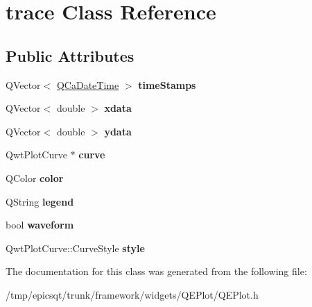 \hypertarget{classtrace}{
\section{trace Class Reference}
\label{classtrace}
}
\subsection*{Public Attributes}
\begin{DoxyCompactItemize}
\item 
\hypertarget{classtrace_a02a177cf962f807fb41bd277040e7225}{
QVector$<$ \hyperlink{classQCaDateTime}{QCaDateTime} $>$ {\bfseries timeStamps}}
\label{classtrace_a02a177cf962f807fb41bd277040e7225}

\item 
\hypertarget{classtrace_aee034ab4b7eb5ed62018399cc5280ee7}{
QVector$<$ double $>$ {\bfseries xdata}}
\label{classtrace_aee034ab4b7eb5ed62018399cc5280ee7}

\item 
\hypertarget{classtrace_a74a99e27ec3315fe20824ef643d7d0fa}{
QVector$<$ double $>$ {\bfseries ydata}}
\label{classtrace_a74a99e27ec3315fe20824ef643d7d0fa}

\item 
\hypertarget{classtrace_a450e899468c18d0f5a2be41285367143}{
QwtPlotCurve $\ast$ {\bfseries curve}}
\label{classtrace_a450e899468c18d0f5a2be41285367143}

\item 
\hypertarget{classtrace_a537d4c3ad1115226dfd52ed0895ff89c}{
QColor {\bfseries color}}
\label{classtrace_a537d4c3ad1115226dfd52ed0895ff89c}

\item 
\hypertarget{classtrace_abc26f3360f820f8dbe0e86a0f396909a}{
QString {\bfseries legend}}
\label{classtrace_abc26f3360f820f8dbe0e86a0f396909a}

\item 
\hypertarget{classtrace_a26de13a7b28c3548fdb9b59677498466}{
bool {\bfseries waveform}}
\label{classtrace_a26de13a7b28c3548fdb9b59677498466}

\item 
\hypertarget{classtrace_abf54492e6c9effd68369d521a97db458}{
QwtPlotCurve::CurveStyle {\bfseries style}}
\label{classtrace_abf54492e6c9effd68369d521a97db458}

\end{DoxyCompactItemize}


The documentation for this class was generated from the following file:\begin{DoxyCompactItemize}
\item 
/tmp/epicsqt/trunk/framework/widgets/QEPlot/QEPlot.h\end{DoxyCompactItemize}
